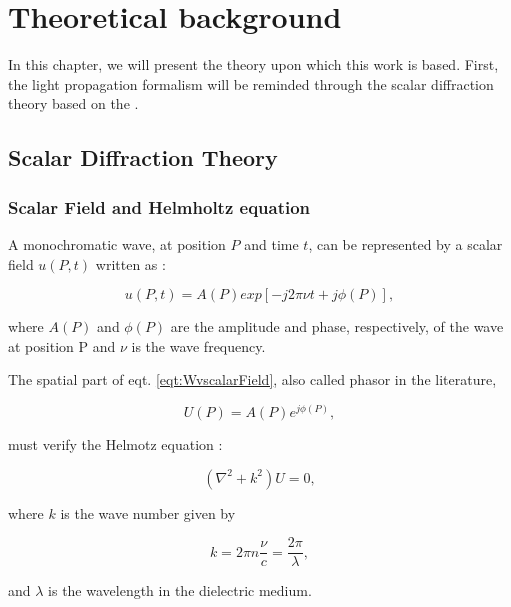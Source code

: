 
\chapter{Theoretical background} 
\label{ch:THback}

In this chapter, we will present the theory upon which this work is based. First, the light propagation formalism will be reminded through the scalar diffraction theory based on the \citet{goodman_1968}.

\section{Scalar Diffraction Theory}
\label{sec:ScaDifTh}

\subsection{Scalar Field and Helmholtz equation}
\label{subsec:ScalF_HelmEqt}

A monochromatic wave, at position $P$ and time $t$, can be represented by a scalar field $u(P,t)$ written as :

\begin{equation}
u(P,t) =  A(P) exp\left[-j2\pi\nu t + j\phi(P)\right],
\label{eqt:WvscalarField}
\end{equation}

where $A(P)$ and $\phi(P)$ are the amplitude and phase, respectively, of the wave at position P and $\nu$ is the wave frequency.

The spatial part of eqt. \eqref{eqt:WvscalarField}, also called  phasor  in the literature, 

\begin{equation}
U(P) = A(P)e^{j\phi(P)},
\label{eqt:phasor}
\end{equation}

must verify the Helmotz equation : 

\begin{equation}
(\nabla^2 + k^2)U = 0,
\label{eqt:HelmholtzEqt}
\end{equation}

where $k$ is the wave number given by

\begin{equation}
k = 2\pi n \frac{\nu}{c} = \frac{2\pi}{\lambda},
\label{eqt:wavenumber}
\end{equation}

and $\lambda$ is the wavelength in the dielectric medium.


